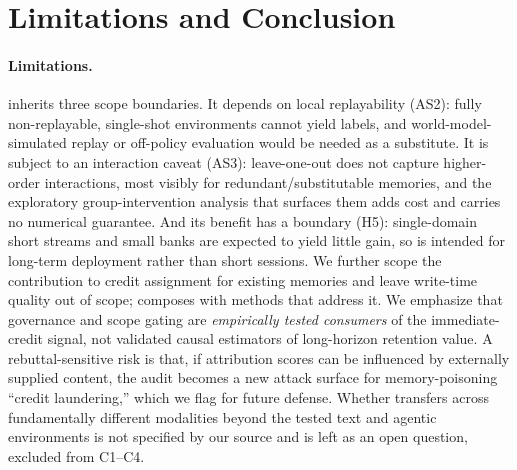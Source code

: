 \clearpage
\section{Limitations and Conclusion}

\paragraph{Limitations.}
\method{} inherits three scope boundaries. It depends on local replayability
(AS2): fully non-replayable, single-shot environments cannot yield \rit{} labels,
and world-model-simulated replay or off-policy evaluation would be needed as a
substitute. It is subject to an interaction caveat (AS3): leave-one-out does not
capture higher-order interactions, most visibly for redundant/substitutable
memories, and the exploratory group-intervention analysis that surfaces them adds
cost and carries no numerical guarantee. And
its benefit has a boundary (H5): single-domain short streams and small banks are
expected to yield little gain, so \method{} is intended for long-term deployment
rather than short sessions. We further scope the contribution to credit assignment
for existing memories and leave write-time quality out of scope; \method{}
composes with methods that address it. We emphasize that governance and scope
gating are \emph{empirically tested consumers} of the immediate-credit signal, not
validated causal estimators of long-horizon retention value. A rebuttal-sensitive
risk is that, if
attribution scores can be influenced by externally supplied content, the audit
becomes a new attack surface for memory-poisoning ``credit laundering,'' which we
flag for future defense. Whether \aca{} transfers across fundamentally different
modalities beyond the tested text and agentic environments is not specified by our
source and is left as an open question, excluded from C1--C4.

